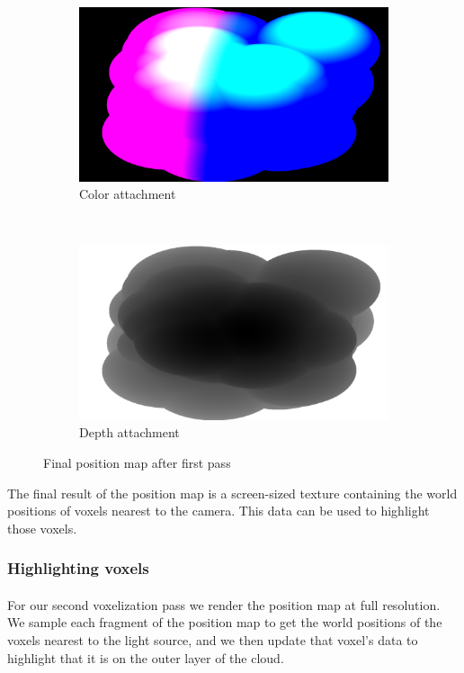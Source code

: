\begin{figure}[h]
\centering
	\begin{subfigure}[t]{0.48\textwidth}
	\includegraphics[width=\textwidth]{../res/positionmapcolor.png}
	\caption{Color attachment}
	\end{subfigure}
	~
	\begin{subfigure}[t]{0.48\textwidth}
	\includegraphics[width=\textwidth]{../res/positionmapdepth.png}
	\caption{Depth attachment}
	\end{subfigure}
\caption{Final position map after first pass}
\end{figure}

The final result of the position map is a screen-sized texture containing the world positions of voxels nearest to the camera. This data can be used to highlight those voxels.

\subsubsection{Highlighting voxels}\paragraph{}
For our second voxelization pass we render the position map at full resolution. 
We sample each fragment of the position map to get the world positions of the voxels nearest to the light source, and we then update that voxel's data to highlight that it is on the outer layer of the cloud. 

